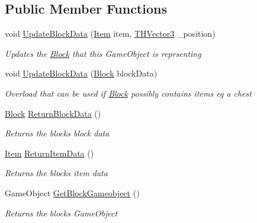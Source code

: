 \subsection*{Public Member Functions}
\begin{DoxyCompactItemize}
\item 
void \hyperlink{class_bee_game_1_1_blocks_1_1_block_game_object_interface_a3ddd5f34156385516a9ad3572160fd99}{Update\+Block\+Data} (\hyperlink{struct_bee_game_1_1_items_1_1_item}{Item} item, \hyperlink{struct_bee_game_1_1_t_h_vector3}{T\+H\+Vector3} \+\_\+position)
\begin{DoxyCompactList}\small\item\em Updates the \hyperlink{class_bee_game_1_1_blocks_1_1_block}{Block} that this Game\+Object is reprsenting \end{DoxyCompactList}\item 
void \hyperlink{class_bee_game_1_1_blocks_1_1_block_game_object_interface_ad3f4f53d3fdb09f46f05a23faa08c12a}{Update\+Block\+Data} (\hyperlink{class_bee_game_1_1_blocks_1_1_block}{Block} block\+Data)
\begin{DoxyCompactList}\small\item\em Overload that can be used if \hyperlink{class_bee_game_1_1_blocks_1_1_block}{Block} possibly contains items eg a chest \end{DoxyCompactList}\item 
\hyperlink{class_bee_game_1_1_blocks_1_1_block}{Block} \hyperlink{class_bee_game_1_1_blocks_1_1_block_game_object_interface_a40b044d5bf2a857ea25796685e23f768}{Return\+Block\+Data} ()
\begin{DoxyCompactList}\small\item\em Returns the block\textquotesingle{}s block data \end{DoxyCompactList}\item 
\hyperlink{struct_bee_game_1_1_items_1_1_item}{Item} \hyperlink{class_bee_game_1_1_blocks_1_1_block_game_object_interface_a224ae292be961a0c3b7675e5a85ddb1b}{Return\+Item\+Data} ()
\begin{DoxyCompactList}\small\item\em Returns the blocks item data \end{DoxyCompactList}\item 
Game\+Object \hyperlink{class_bee_game_1_1_blocks_1_1_block_game_object_interface_acc64daab8f2771a344aa386fa4b86c3b}{Get\+Block\+Gameobject} ()
\begin{DoxyCompactList}\small\item\em Returns the blocks Game\+Object \end{DoxyCompactList}\item 

\end{DoxyCompactItemize}
